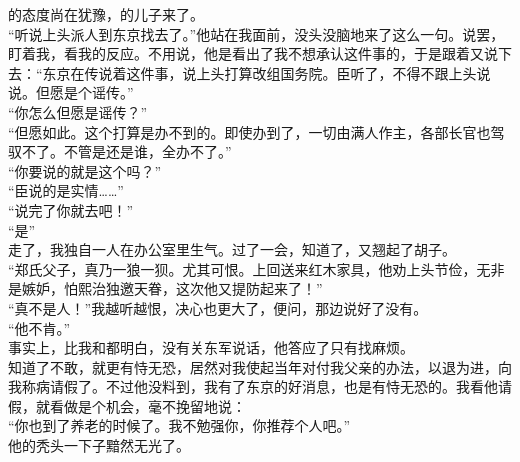 的态度尚在犹豫，的儿子来了。\\

“听说上头派人到东京找去了。”他站在我面前，没头没脑地来了这么一句。说罢，盯着我，看我的反应。不用说，他是看出了我不想承认这件事的，于是跟着又说下去：“东京在传说着这件事，说上头打算改组国务院。臣听了，不得不跟上头说说。但愿是个谣传。”\\

“你怎么但愿是谣传？”\\

“但愿如此。这个打算是办不到的。即使办到了，一切由满人作主，各部长官也驾驭不了。不管是还是谁，全办不了。”\\

“你要说的就是这个吗？”\\

“臣说的是实情……”\\

“说完了你就去吧！”\\

“是”\\

走了，我独自一人在办公室里生气。过了一会，知道了，又翘起了胡子。\\

“郑氏父子，真乃一狼一狈。尤其可恨。上回送来红木家具，他劝上头节俭，无非是嫉妒，怕熙治独邀天眷，这次他又提防起来了！”\\

“真不是人！”我越听越恨，决心也更大了，便问，那边说好了没有。\\

“他不肯。”\\

事实上，比我和都明白，没有关东军说话，他答应了只有找麻烦。\\

知道了不敢，就更有恃无恐，居然对我使起当年对付我父亲的办法，以退为进，向我称病请假了。不过他没料到，我有了东京的好消息，也是有恃无恐的。我看他请假，就看做是个机会，毫不挽留地说：\\

“你也到了养老的时候了。我不勉强你，你推荐个人吧。”\\

他的秃头一下子黯然无光了。\\

